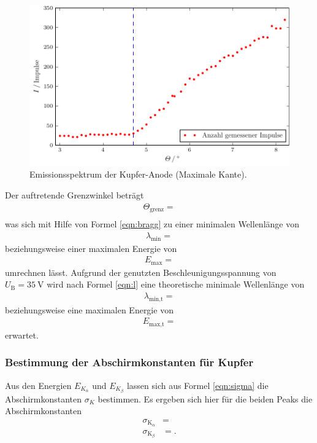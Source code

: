 \begin{figure}
  \centering
  \includegraphics{build/plot_3.pdf}
  \caption{Emissionsspektrum der Kupfer-Anode (Maximale Kante).}
  \label{fig:plot3}
\end{figure}
Der auftretende Grenzwinkel beträgt
\begin{align*}
  \Theta_{\text{grenz}} =  \\
\end{align*}
was sich mit Hilfe von Formel \eqref{eqn:bragg} zu einer minimalen Wellenlänge von
\begin{align*}
  \lambda_{\text{min}} = 
\end{align*}
beziehungsweise einer maximalen Energie von
\begin{align*}
  E_{\text{max}} = 
\end{align*}
umrechnen lässt.
Aufgrund der genutzten Beschleunigungsspannung von $U_\text{B} = \SI{35}{\volt}$ wird nach Formel \eqref{eqn:l} eine theoretische minimale Wellenlänge von
\begin{align*}
  \lambda_{\text{min,t}} = 
\end{align*}
beziehungsweise eine maximalen Energie von
\begin{align*}
  E_{\text{max,t}} = 
\end{align*}
erwartet.
\subsubsection{Bestimmung der Abschirmkonstanten für Kupfer}
Aus den Energien $E_{K_\alpha}$ und $E_{K_\beta}$ lassen sich aus Formel \eqref{eqn:sigma} die Abschirmkonstanten $\sigma_K$ bestimmen.
Es ergeben sich hier für die beiden Peaks die Abschirmkonstanten
\begin{align*}
  \sigma_{\text{K}_{\alpha}} &=  \\
  \sigma_{\text{K}_{\beta}} &= . \\
\end{align*}
